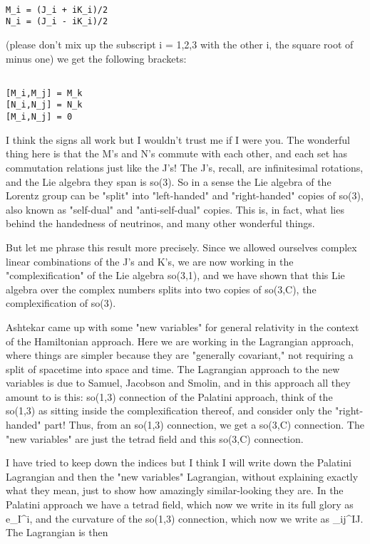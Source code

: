 \begin{verbatim}

M_i = (J_i + iK_i)/2
N_i = (J_i - iK_i)/2
\end{verbatim}
    

(please don't mix up the subscript i = 1,2,3 with the other i, the
square root of minus one) we get the following brackets:


\begin{verbatim}

[M_i,M_j] = M_k
[N_i,N_j] = N_k
[M_i,N_j] = 0
\end{verbatim}
    

I think the signs all work but I wouldn't trust me if I were you.  
The wonderful thing here is that the M's and N's commute with each
other, and each set has commutation relations just like the J's!  The
J's, recall, are infinitesimal rotations, and the Lie algebra they span
is so(3).  So in a sense the Lie algebra of the Lorentz group can
be "split" into "left-handed" and "right-handed" copies of so(3), also
known as "self-dual" and "anti-self-dual" copies.  This is, in fact,
what lies behind the handedness of neutrinos, and many other wonderful
things.  

But let me phrase this result more precisely.  Since we allowed
ourselves complex linear combinations of the J's and K's, we are now
working in the "complexification" of the Lie algebra so(3,1), and we
have shown that this Lie algebra over the complex numbers splits into
two copies of so(3,C), the complexification of so(3).  

Ashtekar came up with some "new variables" for general relativity in the
context of the Hamiltonian approach.  Here we are working in the
Lagrangian approach, where things are simpler because they are
"generally covariant," not requiring a split of spacetime into space and
time.  The Lagrangian approach to the new variables is due to Samuel,
Jacobson and Smolin, and in this approach all they amount to is this:
so(1,3) connection of the Palatini approach, think of the so(1,3) as
sitting inside the complexification thereof, and consider only the
"right-handed" part!  Thus, from an so(1,3) connection, we get a so(3,C)
connection.  The "new variables" are just the tetrad field and this
so(3,C) connection.  

I have tried to keep down the indices but I think I will write down the
Palatini Lagrangian and then the "new variables" Lagrangian, without
explaining exactly what they mean, just to show how amazingly
similar-looking they are.  In the Palatini approach we have a tetrad
field, which now we write in its full glory as e_I^i, and the curvature
of the so(1,3) connection, which now we write as \Omega _{ij}^{IJ}.  The
Lagrangian is then


